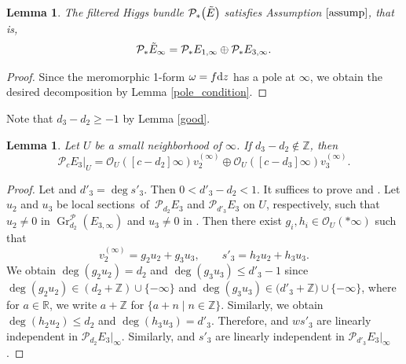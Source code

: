 \documentclass[10pt,a4paper]{amsart}
\numberwithin{equation}{section}
\newtheorem{Lemma}[Theorem]{Lemma}
\newcommand{\Z}{\mathbb{Z}}
\newcommand{\R}{\mathbb{R}}
\newcommand{\gr}{\operatorname{\mathrm{Gr}}}
\begin{document}
\begin{Lemma}\label{assump_satisfy}
 The filtered Higgs bundle $\mathcal{P}_*\bigl(\Tilde{E}\bigr)$ satisfies Assumption $\ref{assump}$, that is,
 \begin{equation*}
 \mathcal{P}_*\Tilde{E}_{\infty} = \mathcal{P}_*E_{1,\infty} \oplus \mathcal{P}_*E_{3,\infty}.
 \end{equation*}
\end{Lemma}
\begin{proof}
 Since the meromorphic 1-form $\omega=f{\rm d}z$ has a pole at $\infty$, we obtain the desired decomposition by Lemma \ref{pole_condition}.
\end{proof}

 Note that $d_3-d_2\geq -1$ by Lemma \ref{good}.
\begin{Lemma}\label{case1}
 Let $U$ be a small neighborhood of $\infty$. If $d_3-d_2\notin\Z$, then
 \begin{equation*}
 \mathcal{P}_{c}E_3|_{U} = \mathcal{O}_U([c-d_2]\infty)v^{(\infty)}_2 \oplus \mathcal{O}_U([c-d_3]\infty)v^{(\infty)}_3.
 \end{equation*}
\end{Lemma}
\begin{proof}
 Let  and $d'_3 = \deg{s'_3}$. Then $0<d'_3-d_2<1$. It suffices to prove  and . Let $u_2$ and $u_3$ be local sections~of~$\mathcal{P}_{d_2}E_3$ and $\mathcal{P}_{d'_3}E_3$ on $U$, respectively, such that $u_2\neq 0$ in $\gr^{\mathcal{P}}_{d_2} (E_{3,\infty})$ and $u_3\neq 0$ in \smash{$\gr^{\mathcal{P}}_{d'_3} (E_{3,\infty})$}. Then there exist $g_i,h_i \in \mathcal{O}_U(*\infty)$ such that
 \begin{equation*}
 v^{(\infty)}_2 = g_2 u_2 +g_3 u_3, \qquad s'_3 = h_2 u_2 +h_3 u_3.
 \end{equation*}
 We obtain $\deg{(g_2 u_2)}=d_2$ and $\deg{(g_3 u_3)}\leq d'_3-1$ since $\deg{(g_2 u_2)}\in (d_2 +\Z) \cup \{-\infty\}$ and $\deg{(g_3 u_3)}\in \big(d'_3 +\Z\big) \cup \{-\infty\}$, where for $a\in \R$, we write $a+\Z$ for $\{a+n\mid n\in\Z\}$.
 Similarly, we obtain $\deg{(h_2 u_2)}\leq d_2$ and $\deg{(h_3 u_3)}=d'_3$.
 Therefore,  and $ws'_3$ are linearly independent in $\mathcal{P}_{d_2}E_3|_{\infty}$. Similarly,  and $s'_3$ are linearly independent in ${\mathcal{P}}_{d'_3} E_{3}|_{\infty}$.
\end{proof}
\end{document}
